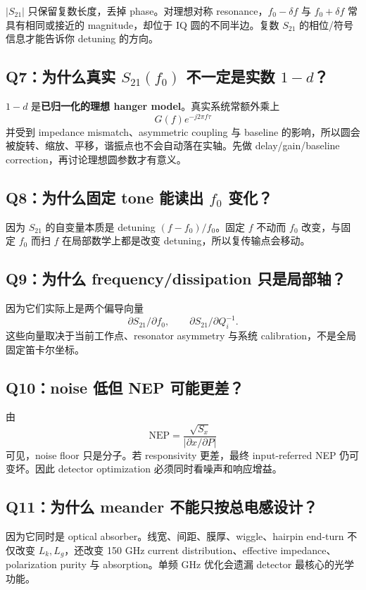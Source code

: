 \documentclass[11pt,a4paper,openany]{ctexrep}
\begin{document}
$|S_{21}|$ 只保留复数长度，丢掉 phase。对理想对称 resonance，$f_0-\delta f$ 与 $f_0+\delta f$ 常具有相同或接近的 magnitude，却位于 IQ 圆的不同半边。复数 $S_{21}$ 的相位/符号信息才能告诉你 detuning 的方向。

\subsection*{Q7：为什么真实 $S_{21}(f_0)$ 不一定是实数 $1-d$？}

$1-d$ 是\textbf{已归一化的理想 hanger model}。真实系统常额外乘上
\[
G(f)e^{-j2\pi f\tau}
\]
并受到 impedance mismatch、asymmetric coupling 与 baseline 的影响，所以圆会被旋转、缩放、平移，谐振点也不会自动落在实轴。先做 delay/gain/baseline correction，再讨论理想圆参数才有意义。

\subsection*{Q8：为什么固定 tone 能读出 $f_0$ 变化？}

因为 $S_{21}$ 的自变量本质是 detuning $(f-f_0)/f_0$。固定 $f$ 不动而 $f_0$ 改变，与固定 $f_0$ 而扫 $f$ 在局部数学上都是改变 detuning，所以复传输点会移动。

\subsection*{Q9：为什么 frequency/dissipation 只是局部轴？}

因为它们实际上是两个偏导向量
\[
\partial S_{21}/\partial f_0,
\qquad
\partial S_{21}/\partial Q_i^{-1}.
\]
这些向量取决于当前工作点、resonator asymmetry 与系统 calibration，不是全局固定笛卡尔坐标。

\subsection*{Q10：noise 低但 NEP 可能更差？}

由
\[
\mathrm{NEP}=\frac{\sqrt{S_x}}{|\partial x/\partial P|}
\]
可见，noise floor 只是分子。若 responsivity 更差，最终 input-referred NEP 仍可变坏。因此 detector optimization 必须同时看噪声和响应增益。

\subsection*{Q11：为什么 meander 不能只按总电感设计？}

因为它同时是 optical absorber。线宽、间距、膜厚、wiggle、hairpin end-turn 不仅改变 $L_k,L_g$，还改变 150 GHz current distribution、effective impedance、polarization purity 与 absorption。单频 GHz 优化会遗漏 detector 最核心的光学功能。
\end{document}
